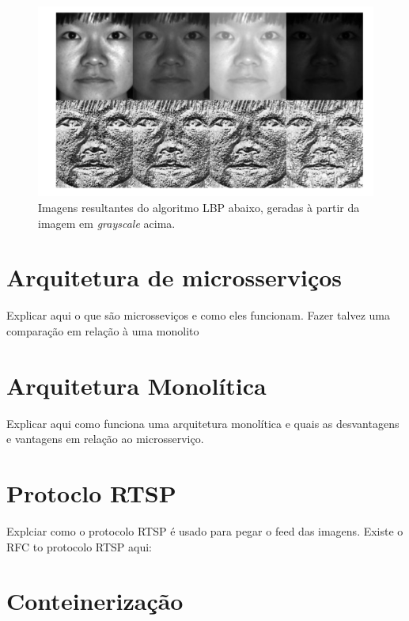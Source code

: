 \documentclass[12pt, %
openright, 
oneside, %
a4paper,    %
brazil]{facom-ufu-abntex2}
\begin{document}
\begin{figure}[!ht]
	\centering
	\includegraphics[width=0.7\linewidth]{grayscale.PNG}
	\caption[De \emph{grayscale} para LBP
	]{Imagens resultantes do algoritmo LBP abaixo, geradas à partir da imagem em \emph{grayscale} acima.}
	\label{fig:graficosVariandoTamanhoRede}
\end{figure}

\section{Arquitetura de microsserviços}

Explicar aqui o que são microsseviços e como eles funcionam. Fazer talvez uma
comparação em relação à uma monolito

\section{Arquitetura Monolítica}

Explicar aqui como funciona uma arquitetura monolítica e quais as desvantagens
e vantagens em relação ao microsserviço.

\section{Protoclo RTSP}

Explciar como o protocolo RTSP é usado para pegar o feed das imagens. Existe o
RFC to protocolo RTSP aqui:

\section{Conteinerização}
\end{document}
